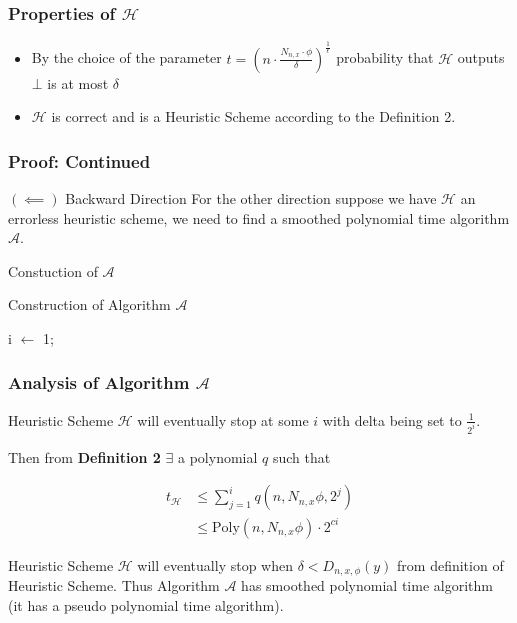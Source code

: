 \begin{frame}
    \frametitle{Properties of $\mathcal{H}$}

    \begin{itemize}
        \item By the choice of the parameter $t = (n \cdot \frac{N_{n, x} \cdot \phi}{\delta}) ^{\frac{1}{\epsilon}}$ probability that $\mathcal{H}$ outputs $\bot$ is at most $\delta$
        \item $\mathcal{H}$ is correct and is a Heuristic Scheme according to the Definition 2.
    \end{itemize}

\end{frame}

\begin{frame}
    \frametitle{Proof: Continued}

    $(\impliedby)$ Backward Direction
    For the other direction suppose we have $\mathcal{H}$ an errorless heuristic scheme, we need to find a smoothed polynomial time
    algorithm $\mathcal{A}$.

    \vspace{2em}

    Constuction of $\mathcal{A}$

    \begin{algorithm}[H]
        \caption{Construction of Algorithm $\mathcal{A}$}
        i $\gets$ 1;\\
    \end{algorithm}

\end{frame}

\begin{frame}
    \frametitle{Analysis of Algorithm {$\mathcal{A}$}}

    Heuristic Scheme $\mathcal{H}$ will eventually stop at some $i$ with delta being set to $\frac{1}{2^i}$.

    Then from \textbf{Definition 2} $\exists$ a polynomial $q$ such that

    
    \begin{align*}
        t_{\mathcal{H}} &\leq \displaystyle\sum_{j = 1}^{i} q(n, N_{n,x} \phi, 2^j)\\
        &\leq \text{Poly}(n, N_{n,x} \phi) \cdot 2^{ci}
    \end{align*}

    Heuristic Scheme $\mathcal{H}$ will eventually stop when $\delta < D_{n,x,\phi}(y)$ from definition of Heuristic Scheme.
    Thus Algorithm $\mathcal{A}$ has smoothed polynomial time algorithm (it has a pseudo polynomial time algorithm).
\end{frame}

